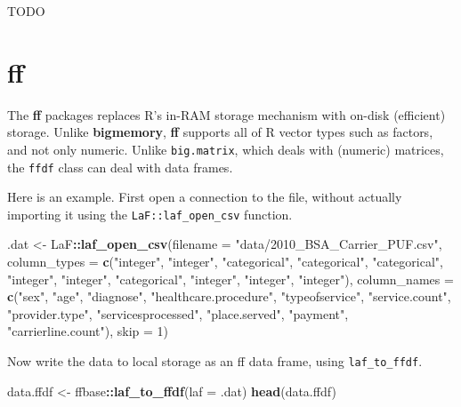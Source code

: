\documentclass[]{book}
\newenvironment{Shaded}{\begin{snugshade}}{\end{snugshade}}
\newcommand{\KeywordTok}[1]{\textcolor[rgb]{0.13,0.29,0.53}{\textbf{#1}}}
\newcommand{\DataTypeTok}[1]{\textcolor[rgb]{0.13,0.29,0.53}{#1}}
\newcommand{\DecValTok}[1]{\textcolor[rgb]{0.00,0.00,0.81}{#1}}
\newcommand{\StringTok}[1]{\textcolor[rgb]{0.31,0.60,0.02}{#1}}
\newcommand{\OperatorTok}[1]{\textcolor[rgb]{0.81,0.36,0.00}{\textbf{#1}}}
\newcommand{\NormalTok}[1]{#1}
\theoremstyle{definition}
\theoremstyle{definition}
\theoremstyle{definition}
\theoremstyle{remark}
\begin{document}
TODO

\section{ff}\label{ff}

The \textbf{ff} packages replaces R's in-RAM storage mechanism with
on-disk (efficient) storage. Unlike \textbf{bigmemory}, \textbf{ff}
supports all of R vector types such as factors, and not only numeric.
Unlike \texttt{big.matrix}, which deals with (numeric) matrices, the
\texttt{ffdf} class can deal with data frames.

Here is an example. First open a connection to the file, without
actually importing it using the \texttt{LaF::laf\_open\_csv} function.

\begin{Shaded}
\begin{Highlighting}[]
\NormalTok{.dat <-}\StringTok{ }\NormalTok{LaF}\OperatorTok{::}\KeywordTok{laf_open_csv}\NormalTok{(}\DataTypeTok{filename =} \StringTok{"data/2010_BSA_Carrier_PUF.csv"}\NormalTok{,}
                    \DataTypeTok{column_types =} \KeywordTok{c}\NormalTok{(}\StringTok{"integer"}\NormalTok{, }\StringTok{"integer"}\NormalTok{, }\StringTok{"categorical"}\NormalTok{, }\StringTok{"categorical"}\NormalTok{, }\StringTok{"categorical"}\NormalTok{, }\StringTok{"integer"}\NormalTok{, }\StringTok{"integer"}\NormalTok{, }\StringTok{"categorical"}\NormalTok{, }\StringTok{"integer"}\NormalTok{, }\StringTok{"integer"}\NormalTok{, }\StringTok{"integer"}\NormalTok{), }
                    \DataTypeTok{column_names =} \KeywordTok{c}\NormalTok{(}\StringTok{"sex"}\NormalTok{, }\StringTok{"age"}\NormalTok{, }\StringTok{"diagnose"}\NormalTok{, }\StringTok{"healthcare.procedure"}\NormalTok{, }\StringTok{"typeofservice"}\NormalTok{, }\StringTok{"service.count"}\NormalTok{, }\StringTok{"provider.type"}\NormalTok{, }\StringTok{"servicesprocessed"}\NormalTok{, }\StringTok{"place.served"}\NormalTok{, }\StringTok{"payment"}\NormalTok{, }\StringTok{"carrierline.count"}\NormalTok{), }
                    \DataTypeTok{skip =} \DecValTok{1}\NormalTok{)}
\end{Highlighting}
\end{Shaded}

Now write the data to local storage as an ff data frame, using
\texttt{laf\_to\_ffdf}.

\begin{Shaded}
\begin{Highlighting}[]
\NormalTok{data.ffdf <-}\StringTok{ }\NormalTok{ffbase}\OperatorTok{::}\KeywordTok{laf_to_ffdf}\NormalTok{(}\DataTypeTok{laf =}\NormalTok{ .dat)}
\KeywordTok{head}\NormalTok{(data.ffdf)}
\end{Highlighting}
\end{Shaded}
\end{document}
